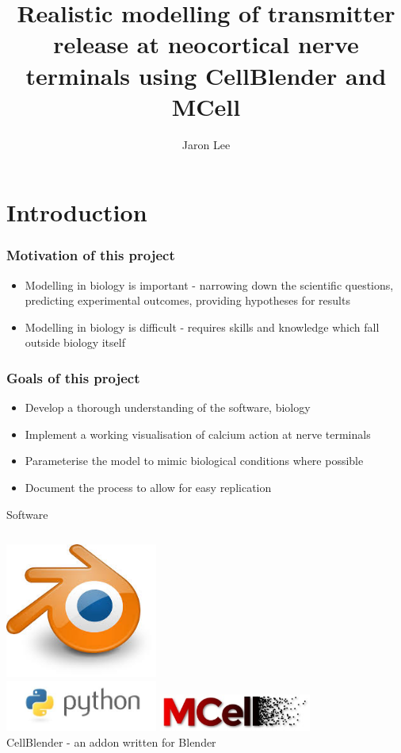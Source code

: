 \documentclass{beamer}
\begin{document}
\begin{frame}
\title{\textbf{Realistic modelling of transmitter release at neocortical nerve terminals using CellBlender and MCell}}
\author{Jaron Lee}
\maketitle
\end{frame}

\section{Introduction}
\frame
{
    \frametitle{Motivation of this project}
    \begin{itemize}
        \item Modelling in biology is important - narrowing down the scientific questions, predicting experimental outcomes, providing hypotheses for results
        \item Modelling in biology is difficult - requires skills and knowledge which fall outside biology itself
    \end{itemize}
}

\frame
{
    \frametitle{Goals of this project}
    \begin{itemize}
        \item<1->Develop a thorough understanding of the software, biology
        \item<2->Implement a working visualisation of calcium action at nerve terminals 
        \item<3->Parameterise the model to mimic biological conditions where possible 
        \item<4->Document the process to allow for easy replication 
    \end{itemize}
}

\begin{frame}{Software}
\begin{columns}[t]
\centering
\includegraphics[width=5cm]{blender.jpeg}\\
\includegraphics[width=5cm]{python.jpeg}
\centering
\includegraphics[width=5cm]{mcell.jpeg}\\
CellBlender - an addon written for Blender
\end{columns}
\end{frame}
\end{document}
